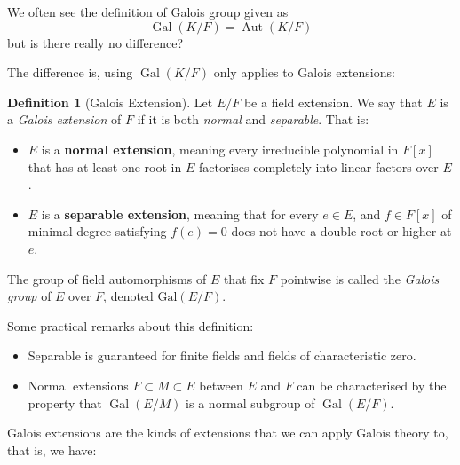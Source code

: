 \documentclass{article}
\theoremstyle{definition}
\newtheorem{definition}{Definition}[section]
\theoremstyle{definition}
\theoremstyle{definition}
\newcommand{\Gal}{\operatorname{Gal}}
\newcommand{\Q}{\mathbb{Q}}
\begin{document}
We often see the definition of Galois group given as $$\operatorname{Gal}(K/F)=\operatorname{Aut}(K/F)$$ 
but is there really no difference?

The difference is, using $\Gal(K/F)$ only applies to Galois extensions:



\begin{definition}[Galois Extension]
Let $E/F$ be a field extension. We say that $E$ is a \emph{Galois extension} of $F$ if it is both \emph{normal} and \emph{separable}. That is:
\begin{itemize}
    \item $E$ is a \textbf{normal extension}, meaning every irreducible polynomial in $F[x]$ that has at least one root in $E$ factorises completely into linear factors over $E$.
    \item $E$ is a \textbf{separable extension}, meaning that for every $e\in E$, and $f\in F[x]$ of minimal degree satisfying $f(e)=0$ does not have a double root or higher at $e$.
\end{itemize}
The group of field automorphisms of $E$ that fix $F$ pointwise is called the \emph{Galois group} of $E$ over $F$, denoted $\mathrm{Gal}(E/F)$.
\end{definition}

Some practical remarks about this definition:
\begin{itemize}
    \item Separable is guaranteed for finite fields and fields of characteristic zero.
    \item Normal extensions $F\subset M\subset E$ between $E$ and $F$ can be characterised by the property that $\Gal(E/M)$ is a normal subgroup of $\Gal(E/F)$.
\end{itemize}

Galois extensions are the kinds of extensions that we can apply Galois theory to, that is, we have:
\end{document}
